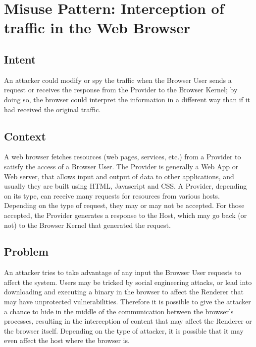 \documentclass{sig-alternate-05-2015}
\begin{document}
\section{Misuse Pattern: Interception of traffic in the Web Browser}
\subsection*{Intent}
An attacker could modify or spy the traffic when the Browser User sends a request or receives the response from the Provider to the Browser Kernel; by doing so, the browser could interpret the information in a different way than if it had received the original traffic.

\subsection*{Context}
A web browser fetches resources (web pages, services, etc.) from a Provider to satisfy the access of a Browser User. The Provider is generally a Web App or Web server, that allows input and output of data to other applications, and usually they are built using HTML, Javascript and CSS. A Provider, depending on its type, can receive many requests for resources from various hosts. Depending on the type of request, they may or may not be accepted. For those accepted, the Provider generates a response to the Host, which may go back (or not) to the Browser Kernel that generated the request.

\subsection*{Problem}
An attacker tries to take advantage of any input the Browser User requests to affect the system. Users may be tricked by social engineering attacks, or lead into downloading and executing a binary in the browser to affect the Renderer that may have unprotected vulnerabilities. Therefore it is possible to give the attacker a chance to hide in the middle of the communication between the browser's processes, resulting in the interception of content that may affect the Renderer or the browser itself. Depending on the type of attacker, it is possible that it may even affect the host where the browser is.
\end{document}
